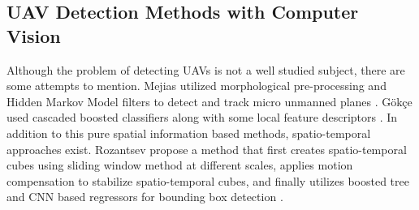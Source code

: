 \documentclass[10pt,twocolumn,letterpaper]{article}
\begin{document}
\subsection{UAV Detection Methods with Computer Vision}
Although the problem of detecting UAVs is not a well studied subject, there are some attempts to mention. Mejias \etal utilized morphological pre-processing and Hidden Markov Model filters to detect and track micro unmanned planes \cite{mejias2010vision}. G\"{o}k\c{c}e \etal used cascaded boosted classifiers along with some local feature descriptors \cite{gokcce2015vision}. In addition to this pure spatial information based methods, spatio-temporal approaches exist. Rozantsev \etal propose a method that first creates spatio-temporal cubes using sliding window method at different scales, applies motion compensation to stabilize spatio-temporal cubes, and finally utilizes boosted tree and CNN based regressors for bounding box detection \cite{EPFL-ARTICLE-218330}.
\end{document}
